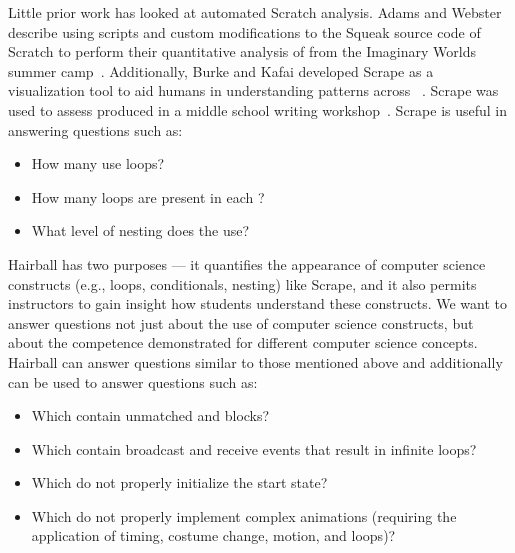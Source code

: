 Little prior work has looked at automated Scratch analysis.  Adams and Webster
describe using scripts and custom modifications to the Squeak source code of
Scratch to perform their quantitative analysis of  from the
Imaginary Worlds summer camp~\cite{Adams:2012:SLP:2157136.2157319}.
Additionally, Burke and Kafai developed Scrape as a visualization tool to aid
humans in understanding patterns across
~\cite{scrape-poster}. Scrape was used to assess 
produced in a middle school writing
workshop~\cite{Burke:2012:WWY:2157136.2157264}. Scrape is useful in answering
questions such as:
\begin{itemize}
\vspace*{-.025in}
\item How many  use loops?
\vspace*{-.025in}
\item How  many loops are present in each \sprogram{}?
\vspace*{-.025in}
\item What level of nesting does the \sprogram{} use?
\vspace*{-.025in}
\end{itemize}

Hairball has two purposes --- it quantifies the appearance of computer science
constructs (e.g., loops, conditionals, nesting) like Scrape, and it also
permits instructors to gain insight how students understand these
constructs. We want to answer questions not just about the use of computer
science constructs, but about the competence demonstrated for different
computer science concepts. Hairball can answer questions similar to those
mentioned above and additionally can be used to answer questions such as:
\begin{itemize}
\vspace*{-.025in}
\item Which  contain unmatched \broadcast{} and \receive{} blocks?
\vspace*{-.025in}
\item Which  contain broadcast and receive events that result in
  infinite loops?
\vspace*{-.025in}
\item Which  do not properly initialize the start state?
\vspace*{-.025in}
\item Which  do not properly implement complex animations
  (requiring the application of timing, costume change, motion, and loops)?
\vspace*{-.025in}
\end{itemize}
\vspace*{0.25in}
